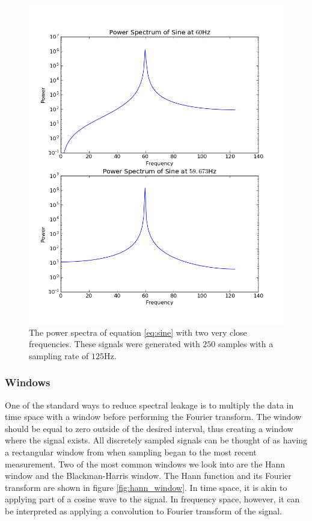 \message{ !name(austin_report.tex)}\documentclass[11pt, letterpage, twocolumn]{article}
\begin{document}
\begin{figure}
  \includegraphics[width=\linewidth]{power_spectrum.png}
  \caption{
    The power spectra of equation \ref{eq:sine} with two very close
    frequencies. These signals were generated with $250$ samples with
    a sampling rate of $125$Hz.
  }
  \label{}
\end{figure}

\subsubsection{Windows}
One of the standard ways to reduce spectral leakage is to multiply the data in
time space with a window before performing the Fourier transform. The
window should be equal to zero outside of the desired interval, thus
creating a window where the signal exists. All discretely sampled
signals can be thought of as having a rectangular window from when
sampling began to the most recent measurement. Two of the
most common windows we look into are the Hann window and the Blackman-Harris
window. The Hann function and its Fourier transform are shown in figure
\ref{fig:hann_window}. In time space, it is akin to applying part of a
cosine wave to the signal. In frequency space, however, it can be
interpreted as applying a convolution to Fourier transform of the
signal. 
\end{document}
